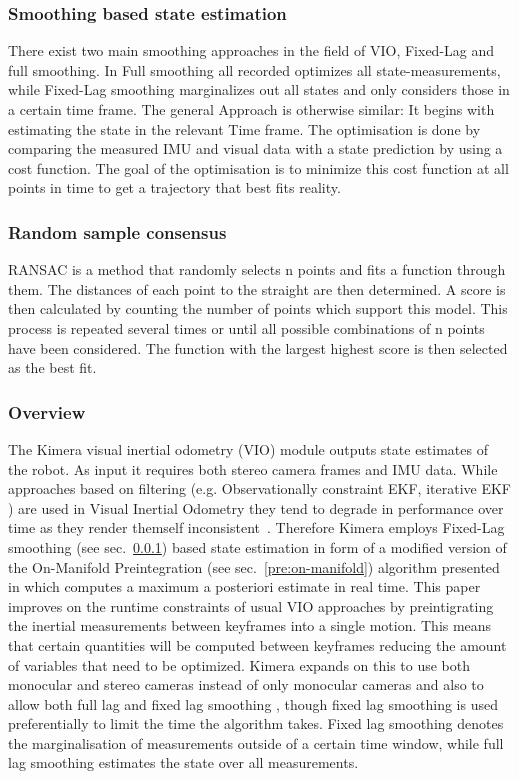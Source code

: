 \documentclass[11pt,a4paper]{article}
\begin{document}
\subsubsection{Smoothing based state estimation} \label{Pre:Smoothing}
There exist two main smoothing approaches in the field of VIO, Fixed-Lag and full smoothing.
In Full smoothing all recorded optimizes all state-measurements, while Fixed-Lag smoothing marginalizes out all states and only considers those in a certain time frame.
The general Approach is otherwise similar: It begins with estimating the state in the relevant Time frame.
The optimisation is done by comparing the measured IMU and visual data with a state prediction by using a cost function. 
The goal of the optimisation is to minimize this cost function at all points in time to get a trajectory that best fits reality.

\subsubsection{Random sample consensus} \label{sec:RANSAC}
RANSAC is a method that randomly selects n points and fits a function through them.
The distances of each point to the straight are then determined.
A score is then calculated by counting the number of points which support this model.
This process is repeated several times or until all possible combinations of n points have been considered. 
The function with the largest highest score is then selected as the best fit.

\subsubsection{Overview} \label{Sec:K-VIO overview}
The Kimera visual inertial odometry (VIO) module outputs state estimates of the robot.
As input it requires both stereo camera frames and IMU data. 
While approaches based on filtering (e.g. Observationally constraint EKF, iterative EKF ) are used in Visual Inertial Odometry they tend to degrade in performance over time as they render themself inconsistent~\cite{Forster_2017}. 
Therefore Kimera employs Fixed-Lag smoothing (see sec.~\ref{Pre:Smoothing}) based state estimation in form of  a modified version of the On-Manifold Preintegration (see sec.~\ref{pre:on-manifold}) algorithm presented in \cite{Forster_2017} which computes a maximum a posteriori estimate in real time. 
This paper improves on the runtime constraints of usual VIO approaches by preintigrating the inertial measurements between keyframes into a single motion. 
This means that certain quantities will be computed between keyframes reducing the amount of variables that need to be optimized. 
Kimera expands on this to use both monocular and stereo cameras instead of only monocular cameras and also to allow both full lag and fixed lag smoothing , though fixed lag smoothing is used preferentially to limit the time the algorithm takes.
Fixed lag smoothing denotes the marginalisation of measurements outside of a certain time window, while full lag smoothing estimates the state over all measurements.
\end{document}
